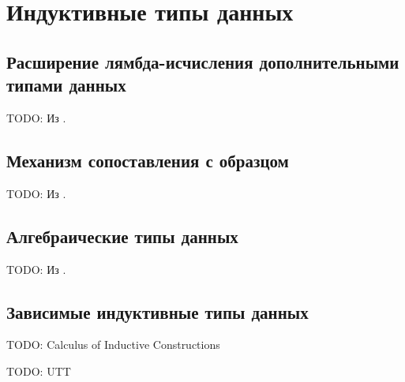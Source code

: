 \section{Индуктивные типы данных}

\subsection{Расширение лямбда-исчисления дополнительными типами данных}

TODO: Из \cite{tapl}.

\subsection{Механизм сопоставления с образцом}

TODO: Из \cite{proving-properties-of-programs-by-structural-induction}.

\subsection{Алгебраические типы данных}

TODO: Из \cite{transformation-system-for-developing-recursive-programs}.

\subsection{Зависимые индуктивные типы данных}

TODO: Calculus of Inductive Constructions

TODO: UTT
